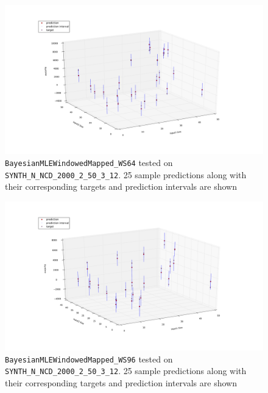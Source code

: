 \begin{figure}[htbp]
  \centering
    \includegraphics[width=\linewidth]{./Figures/sampled_25_predictions_bmle_mapped_ws64_SYNTH_D_NCD_2000_2_50_3_12.pdf}
  \caption{\texttt{BayesianMLEWindowedMapped\_WS64} tested on \texttt{SYNTH\_N\_NCD\_2000\_2\_50\_3\_12}. 25 sample predictions along with their corresponding targets and prediction intervals are shown}
 \label{fig:sampled_25_predictions_bmle_mapped_ws64_SYNTH_D_NCD_2000_2_50_3_12}
\end{figure}

\begin{figure}[htbp]
  \centering
    \includegraphics[width=\linewidth]{./Figures/sampled_25_predictions_bmle_mapped_ws96_SYNTH_D_NCD_2000_2_50_3_12.pdf}
  \caption{\texttt{BayesianMLEWindowedMapped\_WS96} tested on \texttt{SYNTH\_N\_NCD\_2000\_2\_50\_3\_12}. 25 sample predictions along with their corresponding targets and prediction intervals are shown}
 \label{fig:sampled_25_predictions_bmle_mapped_ws96_SYNTH_D_NCD_2000_2_50_3_12}
\end{figure}

